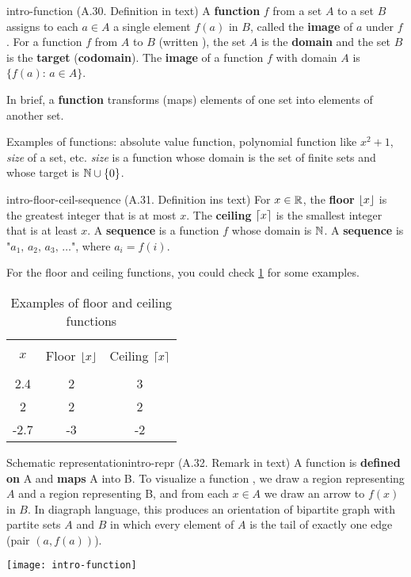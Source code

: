 \documentclass[../src/handouts/main.tex]{subfiles}
\begin{document}
\begin{definition}{}{intro-function}
  (A.30. Definition in text)
  A \textbf{function} $f$ from a set $A$ to a set $B$ assigns to each $a \in A$ a single element $f(a)$ in $B$, called the \textbf{image} of $a$ under $f$.
  For a function $f$ from $A$ to $B$ (written {}), the set $A$ is the \textbf{domain} and the set $B$ is the \textbf{target} (\textbf{codomain}). The \textbf{image} of a function $f$ with domain $A$ is $\{ f(a):\, a \in A \}$.
\end{definition}

In brief, a \textbf{function} transforms (maps) elements of one set into elements of another set.

Examples of functions: absolute value function, polynomial function like $x^2 + 1$, \textit{size} of a set, etc. \textit{size} is a function whose domain is the set of finite sets and whose target is $\mathbb{N} \cup \{0\}$.

\begin{definition}{}{intro-floor-ceil-sequence}
  (A.31. Definition ins text)
  For $x \in \mathbb{R}$, the \textbf{floor} $\lfloor x\rfloor$ is the greatest integer that is at most $x$.
  The \textbf{ceiling} $\lceil x\rceil$ is the smallest integer that is at least $x$.
  A \textbf{sequence} is a function $f$ whose domain is $\mathbb{N}$.
  A \textbf{sequence} is "$a_1,\, a_2,\, a_3,\, \ldots$", where $a_i = f(i)$.
\end{definition}

For the floor and ceiling functions, you could check \cref{table:intro-ex-floor-ceil} for some examples.

\begin{table}[htbp]
  \def \gap {\\[-0.5em]}
  \centering
  \begin{tabular}{ccc}
    \hline \gap
    $x$  & Floor $\lfloor x\rfloor$ & Ceiling $\lceil x\rceil$ \gap \\ \hline
    2.4  & 2                 & 3                       \\
    2    & 2                 & 2                       \\
    -2.7 & -3                & -2                      \\ \hline
  \end{tabular}
  \caption{Examples of floor and ceiling functions}
  \label{table:intro-ex-floor-ceil}
\end{table}

\begin{remark}{Schematic representation}{intro-repr}
  (A.32. Remark in text)
  A function {} is \textbf{defined on} A and \textbf{maps} A into B.
  To visualize a function {}, we draw a region representing $A$ and a region representing B, and from each $x \in A$ we draw an arrow to $f(x)$ in $B$.
  In diagraph language, this produces an orientation of bipartite graph with partite sets $A$ and $B$ in which every element of $A$ is the tail of exactly one edge (pair $(a, f(a))$).

  \centering
  \texttt{[image: intro-function]}
\end{remark}
\end{document}
